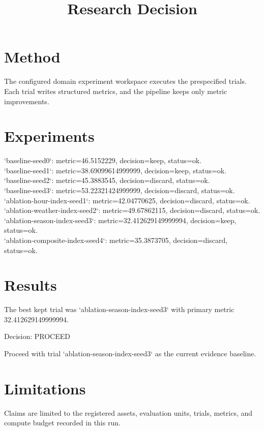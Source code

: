 \documentclass{article}
\begin{document}
\section{Method}
The configured domain experiment workspace executes the prespecified trials.
Each trial writes structured metrics, and the pipeline keeps only metric improvements.

\section{Experiments}
\noindent `baseline-seed0`: metric=46.5152229, decision=keep, status=ok.\\
\noindent `baseline-seed1`: metric=38.69099614999999, decision=keep, status=ok.\\
\noindent `baseline-seed2`: metric=45.3883545, decision=discard, status=ok.\\
\noindent `baseline-seed3`: metric=53.22321424999999, decision=discard, status=ok.\\
\noindent `ablation-hour-index-seed1`: metric=42.04770625, decision=discard, status=ok.\\
\noindent `ablation-weather-index-seed2`: metric=49.67862115, decision=discard, status=ok.\\
\noindent `ablation-season-index-seed3`: metric=32.412629149999994, decision=keep, status=ok.\\
\noindent `ablation-composite-index-seed4`: metric=35.3873705, decision=discard, status=ok.\\

\section{Results}
The best kept trial was `ablation-season-index-seed3` with primary metric 32.412629149999994.
\title{Research Decision}
\maketitle

Decision: PROCEED

Proceed with trial `ablation-season-index-seed3` as the current evidence baseline.

\section{Limitations}
Claims are limited to the registered assets, evaluation units, trials, metrics, and compute budget recorded in this run.
\end{document}

